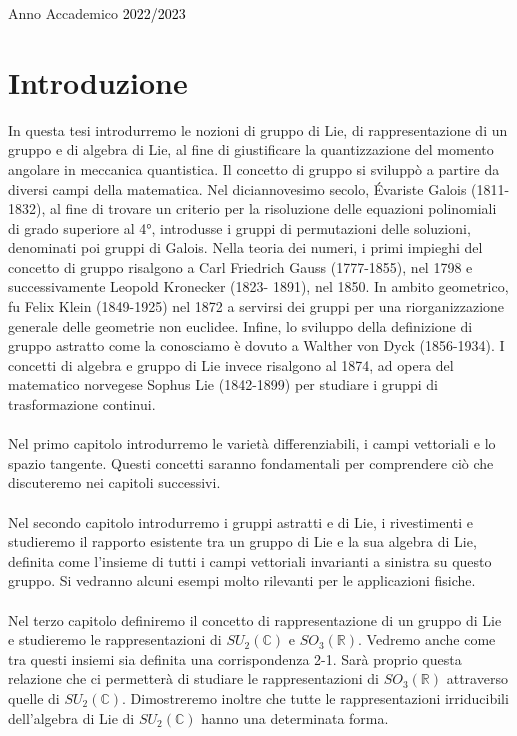 \documentclass[12pt,a4paper]{report}
\theoremstyle{definition}
\theoremstyle{Theorem}
\theoremstyle{definition}
\theoremstyle{definition}
\theoremstyle{definition}
\begin{document}
\begin{frontespizio}
\begin{titlepage}
			\vspace{40mm}
			
			\begin{center}
				Anno Accademico \textcolor{black}{ 2022/2023}
			\end{center}
			
		\end{titlepage}
		\end{frontespizio}
	\tableofcontents
	\chapter*{Introduzione}
	In questa tesi introdurremo le nozioni di gruppo di Lie, di rappresentazione di un gruppo e di algebra di Lie, al fine di giustificare la quantizzazione del momento angolare in meccanica quantistica. Il concetto di gruppo si sviluppò a partire da diversi campi della matematica. Nel diciannovesimo secolo, Évariste Galois (1811-1832), al fine di trovare un criterio per la risoluzione delle equazioni polinomiali di grado superiore al 4°, introdusse i gruppi di permutazioni delle soluzioni, denominati poi gruppi di Galois. Nella teoria dei numeri, i primi impieghi del concetto di gruppo risalgono a Carl Friedrich Gauss (1777-1855), nel 1798 e successivamente Leopold Kronecker (1823-
	1891), nel 1850. In ambito geometrico, fu Felix Klein (1849-1925) nel 1872 a servirsi dei gruppi per una riorganizzazione generale delle geometrie non euclidee. Infine, lo sviluppo della definizione di gruppo astratto come la conosciamo è dovuto a  Walther von Dyck (1856-1934). I concetti di algebra e gruppo di Lie invece risalgono al 1874, ad opera del matematico norvegese Sophus Lie (1842-1899) per studiare i gruppi di trasformazione continui.
	\\
	\\
	Nel primo capitolo introdurremo le varietà differenziabili, i campi vettoriali e lo spazio tangente. Questi concetti saranno fondamentali per comprendere ciò che discuteremo nei capitoli successivi.\\
	\\
	Nel secondo capitolo introdurremo i gruppi astratti e di Lie, i rivestimenti e studieremo il rapporto esistente tra un gruppo di Lie e la sua algebra di Lie, definita come l'insieme di tutti i campi vettoriali invarianti a sinistra su questo gruppo. Si vedranno alcuni esempi molto rilevanti per le applicazioni fisiche.\\
	\\
	Nel terzo capitolo definiremo il concetto di rappresentazione di un gruppo di Lie e studieremo le rappresentazioni di $SU_2(\mathbb{C})$ e $SO_3(\mathbb{R})$. Vedremo anche come tra questi insiemi sia definita una corrispondenza 2-1. Sarà proprio questa relazione che ci permetterà di studiare le rappresentazioni di $SO_3(\mathbb{R})$ attraverso quelle di $SU_2(\mathbb{C})$. Dimostreremo inoltre che tutte le rappresentazioni irriducibili dell'algebra di Lie di $SU_2(\mathbb{C})$ hanno una determinata forma.\\
\end{document}

